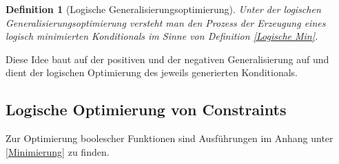 \documentclass[draft]{scrreprt}
\newtheorem{Def}{Definition }[section]
\begin{document}
\begin{Def}[Logische Generalisierungsoptimierung]\label{Logische Genopt}
	Unter der logischen \\ Generalisierungsoptimierung versteht man den Prozess der Erzeugung eines logisch minimierten Konditionals im Sinne von Definition \ref{Logische Min}.
\end{Def}
Diese Idee baut auf der positiven und der negativen Generalisierung auf und dient der logischen Optimierung des jeweils generierten Konditionals.

\subsection{Logische Optimierung von Constraints} \label{LogOpt}
Zur Optimierung boolescher Funktionen sind Ausführungen im Anhang unter \ref{Minimierung} zu finden.
\end{document}
